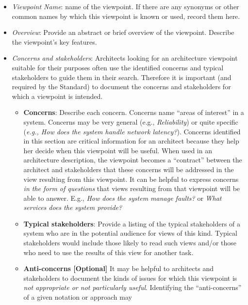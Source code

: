 \begin{itemize}
\item {\em Viewpoint Name}: name of the viewpoint. If there are any synonyms or other common names by which this viewpoint is
known or used, record them here.
\item {\em Overview}: Provide an abstract or brief overview of the viewpoint. 
Describe the viewpoint's key features.
\item {\em Concerns and stakeholders}: Architects looking for an architecture viewpoint suitable for their
purposes often use the identified concerns and typical stakeholders to
guide them in their search.  Therefore it is important (and required
by the Standard) to document the concerns and stakeholders for which a
viewpoint is intended.
\begin{itemize}
\item {\bf Concerns}: Describe each concern.
Concerns name ``areas of interest'' in a system.
Concerns may be very general (e.g., \textit{Reliability}) or quite
specific (\textit{e.g., How does the system handle network latency?}).
Concerns identified in this section are critical information for an
architect because they help her decide when this viewpoint will be
useful.
When used in an architecture description, the viewpoint becomes a
``contract'' between the architect and stakeholders that these
concerns will be addressed in the view resulting from this viewpoint.
It can be helpful to express concerns \emph{in the form of questions}
that views resulting from that viewpoint will be able to answer. E.g., {\em How does the system manage faults?} or {\em What services does the system provide?}
\item {\bf Typical stakeholders}: Provide a listing of the typical stakeholders of a system who
  are in the potential audience for views of this kind.
Typical stakeholders would include those likely to read such views
and/or those who need to use the results of this view for another
task.
\item {\bf Anti-concerns [Optional]} It may be helpful to architects and stakeholders to
document the kinds of issues for which this viewpoint is \emph{not
  appropriate or not particularly useful}.
Identifying the ``anti-concerns'' of a given notation or approach may

\end{itemize}
\end{itemize}
